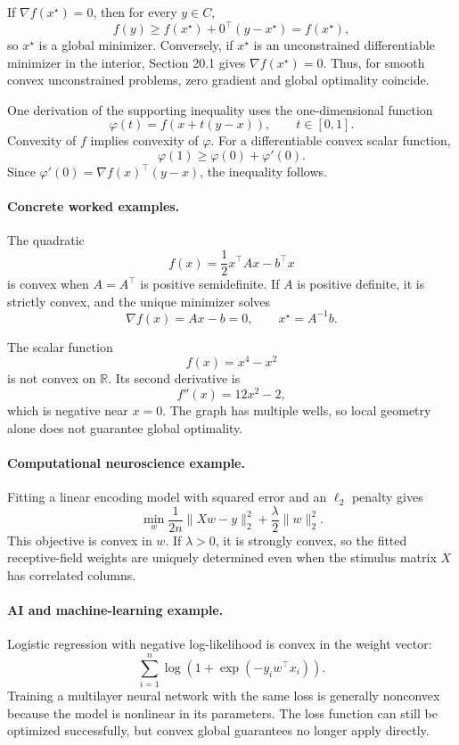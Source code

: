 If \(\nabla f(x^\star)=0\), then for every \(y\in C\),
\[
f(y)\ge f(x^\star)+0^\top(y-x^\star)=f(x^\star),
\]
so \(x^\star\) is a global minimizer. Conversely, if \(x^\star\) is an unconstrained differentiable minimizer in the interior, Section 20.1 gives \(\nabla f(x^\star)=0\). Thus, for smooth convex unconstrained problems, zero gradient and global optimality coincide.

One derivation of the supporting inequality uses the one-dimensional function
\[
\varphi(t)=f(x+t(y-x)),\qquad t\in[0,1].
\]
Convexity of \(f\) implies convexity of \(\varphi\). For a differentiable convex scalar function,
\[
\varphi(1)\ge \varphi(0)+\varphi'(0).
\]
Since \(\varphi'(0)=\nabla f(x)^\top(y-x)\), the inequality follows.

\paragraph{Concrete worked examples.}
The quadratic
\[
f(x)=\frac{1}{2}x^\top Ax-b^\top x
\]
is convex when \(A=A^\top\) is positive semidefinite. If \(A\) is positive definite, it is strictly convex, and the unique minimizer solves
\[
\nabla f(x)=Ax-b=0,
\qquad
x^\star=A^{-1}b.
\]

The scalar function
\[
f(x)=x^4-x^2
\]
is not convex on \(\mathbb R\). Its second derivative is
\[
f''(x)=12x^2-2,
\]
which is negative near \(x=0\). The graph has multiple wells, so local geometry alone does not guarantee global optimality.

\paragraph{Computational neuroscience example.}
Fitting a linear encoding model with squared error and an \(\ell_2\) penalty gives
\[
\min_w \frac{1}{2n}\|Xw-y\|_2^2+\frac{\lambda}{2}\|w\|_2^2.
\]
This objective is convex in \(w\). If \(\lambda>0\), it is strongly convex, so the fitted receptive-field weights are uniquely determined even when the stimulus matrix \(X\) has correlated columns.

\paragraph{AI and machine-learning example.}
Logistic regression with negative log-likelihood is convex in the weight vector:
\[
\sum_{i=1}^n \log(1+\exp(-y_iw^\top x_i)).
\]
Training a multilayer neural network with the same loss is generally nonconvex because the model is nonlinear in its parameters. The loss function can still be optimized successfully, but convex global guarantees no longer apply directly.

